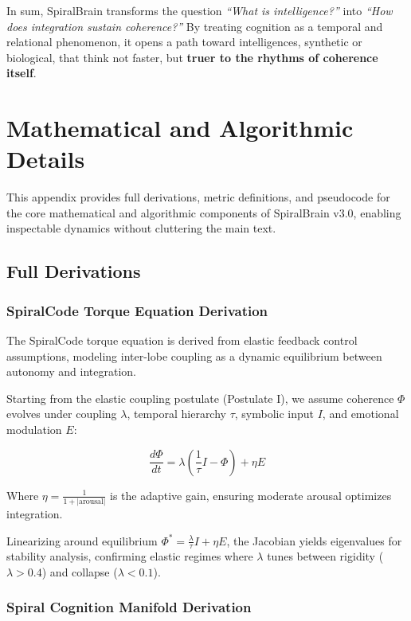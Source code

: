 \documentclass[11pt,a4paper]{article}
\begin{document}
In sum, SpiralBrain transforms the question \textit{``What is intelligence?''} into \textit{``How does integration sustain coherence?''}
By treating cognition as a temporal and relational phenomenon, it opens a path toward intelligences, synthetic or biological, that think not faster, but \textbf{truer to the rhythms of coherence itself}.

\appendix
\section{Mathematical and Algorithmic Details}
\label{app:math}

This appendix provides full derivations, metric definitions, and pseudocode for the core mathematical and algorithmic components of SpiralBrain v3.0, enabling inspectable dynamics without cluttering the main text.

\subsection{Full Derivations}

\subsubsection{SpiralCode Torque Equation Derivation}

The SpiralCode torque equation is derived from elastic feedback control assumptions, modeling inter-lobe coupling as a dynamic equilibrium between autonomy and integration.

Starting from the elastic coupling postulate (Postulate I), we assume coherence \(\Phi\) evolves under coupling \(\lambda\), temporal hierarchy \(\tau\), symbolic input \(I\), and emotional modulation \(E\):

\[
\frac{d\Phi}{dt} = \lambda \left( \frac{1}{\tau} I - \Phi \right) + \eta E
\]

Where \(\eta = \frac{1}{1 + |\text{arousal}|}\) is the adaptive gain, ensuring moderate arousal optimizes integration.

Linearizing around equilibrium \(\Phi^* = \frac{\lambda}{\tau} I + \eta E\), the Jacobian yields eigenvalues for stability analysis, confirming elastic regimes where \(\lambda\) tunes between rigidity (\(\lambda > 0.4\)) and collapse (\(\lambda < 0.1\)).

\subsubsection{Spiral Cognition Manifold Derivation}
\end{document}
